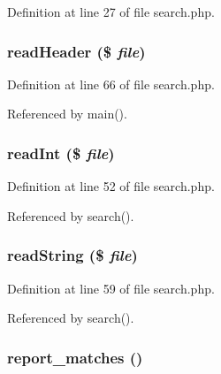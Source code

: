 Definition at line 27 of file search.php.\hypertarget{search_8php_6f8f64c88f050e09fee6995bab140a66}{
\subsubsection[readHeader]{\setlength{\rightskip}{0pt plus 5cm}read\-Header (\$ {\em file})}}
\label{search_8php_6f8f64c88f050e09fee6995bab140a66}




Definition at line 66 of file search.php.

Referenced by main().\hypertarget{search_8php_a27cf6d8c68d6ccde28ac7e073d23d13}{
\subsubsection[readInt]{\setlength{\rightskip}{0pt plus 5cm}read\-Int (\$ {\em file})}}
\label{search_8php_a27cf6d8c68d6ccde28ac7e073d23d13}




Definition at line 52 of file search.php.

Referenced by search().\hypertarget{search_8php_c66aa84aaa7248d0fa8e4144824c7786}{
\subsubsection[readString]{\setlength{\rightskip}{0pt plus 5cm}read\-String (\$ {\em file})}}
\label{search_8php_c66aa84aaa7248d0fa8e4144824c7786}




Definition at line 59 of file search.php.

Referenced by search().\hypertarget{search_8php_c454a359a66d494b497d195ee5ddedea}{
\subsubsection[report\_\-matches]{\setlength{\rightskip}{0pt plus 5cm}report\_\-matches ()}}
\label{search_8php_c454a359a66d494b497d195ee5ddedea}




